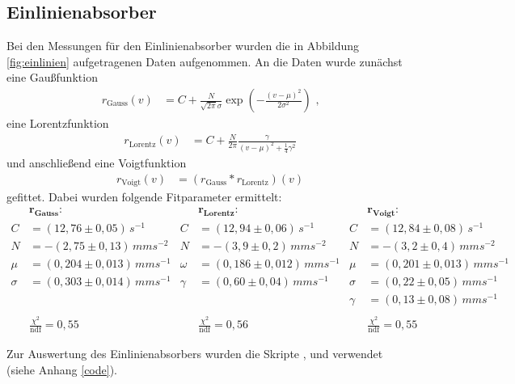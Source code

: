 \subsection{Einlinienabsorber}\label{einlinien}
Bei den Messungen für den Einlinienabsorber wurden die in Abbildung \ref{fig:einlinien} aufgetragenen Daten aufgenommen. An die Daten wurde zunächst eine Gaußfunktion
\begin{align}
	r_\mathrm{Gauss}(v)&=C+\frac{N}{\sqrt{2\pi}\sigma}\exp(-\frac{(v-\mu)^2}{2\sigma^2})\text{ ,}
\end{align}
eine Lorentzfunktion 
\begin{align}
	r_\mathrm{Lorentz}(v)&=C+\frac{N}{2\pi}\frac{\gamma}{\left(v-\mu\right)^2+\frac14\gamma^2}
\end{align}
und anschließend eine Voigtfunktion 
\begin{align}
	r_\mathrm{Voigt}(v)&=\left(r_\mathrm{Gauss}*r_\mathrm{Lorentz}\right)(v)
\end{align}
gefittet. Dabei wurden folgende Fitparameter ermittelt:
\begin{align*}
	&\mathbf{r_\textbf{Gauss}}\textbf{:}&&\mathbf{r_\textbf{Lorentz}}\textbf{:}&&\mathbf{r_\textbf{Voigt}}\textbf{:}\\
	C&=(12,76\pm0,05)\,\si{s^{-1}}&C&=(12,94\pm0,06)\,\si{s^{-1}}&C&=(12,84\pm0,08)\,\si{s^{-1}}
	\\N&=-(2,75\pm0,13)\,\si{mms^{-2}}&N&=-(3,9\pm0,2)\,\si{mms^{-2}}&N&=-(3,2\pm0,4)\,\si{mms^{-2}}
	\\\mu&=(0,204\pm0,013)\,\si{mms^{-1}}&\omega&=(0,186\pm0,012)\,\si{mms^{-1}}&\mu&=(0,201\pm0,013)\,\si{mms^{-1}}
	\\\sigma&=(0,303\pm0,014)\,\si{mms^{-1}}&\gamma&=(0,60\pm0,04)\,\si{mms^{-1}}&\sigma&=(0,22\pm0,05)\,\si{mms^{-1}}
	\\&&&&\gamma&=(0,13\pm0,08)\,\si{mms^{-1}}\\\ 
	\\&\frac{\chi^2}{\mathrm{ndf}}=0,55&&\frac{\chi^2}{\mathrm{ndf}}=0,56&&\frac{\chi^2}{\mathrm{ndf}}=0,55
\end{align*}

Zur Auswertung des Einlinienabsorbers wurden die Skripte ,  und  verwendet (siehe Anhang \ref{code}).

